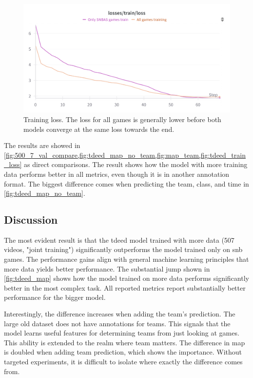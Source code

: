 \begin{figure}
    \centering
    \includegraphics[width=0.5\linewidth]{figures/tdeed_train_loss.png}
    \caption{Training loss. The loss for all games is generally lower before both models converge at the same loss towards the end. }
    \label{fig:tdeed_train_loss}
\end{figure}

The results are showed in \cref{fig:500_7_val_compare,fig:tdeed_map_no_team,fig:map_team,fig:tdeed_train_loss} as direct comparisons. The result shows how the model with more training data performs better in all metrics, even though it is in another annotation format. The biggest difference comes when predicting the team, class, and time in \cref{fig:tdeed_map_no_team}.

\subsection{Discussion}
\label{ssec:ex5_discussion}



The most evident result is that the \acrshort{tdeed} model trained with more data (507 videos, "joint training") significantly outperforms the model trained only on \acrshort{snb} games. The performance gains align with general machine learning principles that more data yields better performance. The substantial jump shown in \cref{fig:tdeed_map} shows how the model trained on more data performs significantly better in the most complex task. All reported metrics report substantially better performance for the bigger model. 



Interestingly, the difference increases when adding the team's prediction. The large old dataset does not have annotations for teams. This signals that the model learns useful features for determining teams from just looking at games. This ability is extended to the realm where team matters. The difference in \acrshort{map} is doubled when adding team prediction, which shows the importance. Without targeted experiments, it is difficult to isolate where exactly the difference comes from.  




